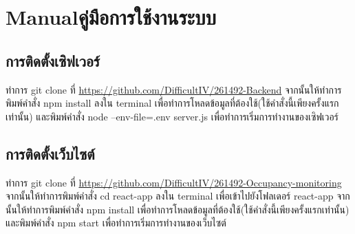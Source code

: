 \chapter{\ifenglish Manual\else คู่มือการใช้งานระบบ\fi}

\section{การติดตั้งเซิฟเวอร์}
    ทำการ git clone ที่ \url{https://github.com/DifficultIV/261492-Backend} จากนั้นให้ทำการพิมพ์คำสั่ง npm install ลงใน terminal เพื่อทำการโหลดข้อมูลที่ต้องใช้(ใช้คำสั่งนี้เพียงครั้งแรกเท่านั้น) และพิมพ์คำสั่ง node --env-file=.env server.js เพื่อทำการเริ่มการทำงานของเซิฟเวอร์

\section{การติดตั้งเว็บไซต์}    
    ทำการ git clone ที่ \url{https://github.com/DifficultIV/261492-Occupancy-monitoring} จากนั้นให้ทำการพิมพ์คำสั่ง cd react-app ลงใน terminal เพื่อเข้าไปยังโฟลเดอร์ react-app จากนั้นให้ทำการพิมพ์คำสั่ง npm install เพื่อทำการโหลดข้อมูลที่ต้องใช้(ใช้คำสั่งนี้เพียงครั้งแรกเท่านั้น) และพิมพ์คำสั่ง npm start เพื่อทำการเริ่มการทำงานของเว็บไซต์